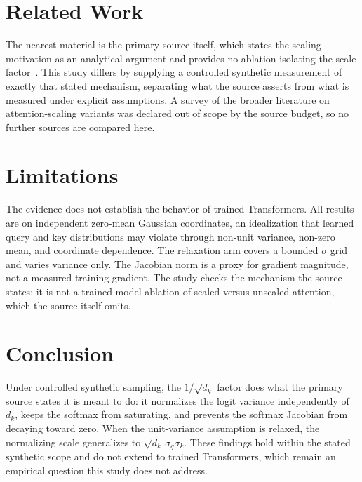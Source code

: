 \documentclass{article}
\begin{document}
\section{Related Work}

The nearest material is the primary source itself, which states the scaling
motivation as an analytical argument and provides no ablation isolating the
scale factor~\citep{vaswani2017attention}. This study differs by supplying a
controlled synthetic measurement of exactly that stated mechanism, separating
what the source asserts from what is measured under explicit assumptions. A
survey of the broader literature on attention-scaling variants was declared out
of scope by the source budget, so no further sources are compared here.

\section{Limitations}

The evidence does not establish the behavior of trained Transformers. All
results are on independent zero-mean Gaussian coordinates, an idealization that
learned query and key distributions may violate through non-unit variance,
non-zero mean, and coordinate dependence. The relaxation arm covers a bounded
$\sigma$ grid and varies variance only. The Jacobian norm is a proxy for
gradient magnitude, not a measured training gradient. The study checks the
mechanism the source states; it is not a trained-model ablation of scaled
versus unscaled attention, which the source itself omits.

\section{Conclusion}

Under controlled synthetic sampling, the $1/\sqrt{d_k}$ factor does what the
primary source states it is meant to do: it normalizes the logit variance
independently of $d_k$, keeps the softmax from saturating, and prevents the
softmax Jacobian from decaying toward zero. When the unit-variance assumption
is relaxed, the normalizing scale generalizes to $\sqrt{d_k}\,\sigma_q\sigma_k$.
These findings hold within the stated synthetic scope and do not extend to
trained Transformers, which remain an empirical question this study does not
address.



\end{document}
